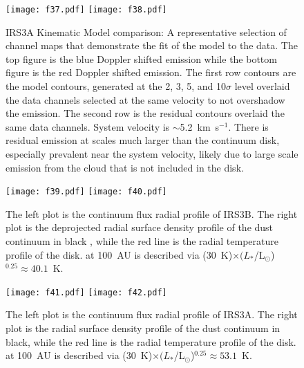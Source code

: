 \documentclass[twocolumn, 12pt]{aastex63}
\newcommand{\ab}{$\sim$}
\newcommand{\lsun}{L$_{\odot}$}
\begin{document}
\begin{figure}[H]
\begin{center}
\texttt{[image: f37.pdf]}
\texttt{[image: f38.pdf]}
\end{center}
\caption{IRS3A Kinematic Model comparison: A representative selection of channel maps that demonstrate the fit of the model to the data. The top figure is the blue Doppler shifted emission while the bottom figure is the red Doppler shifted emission. The first row contours are the model contours, generated at the 2, 3, 5, and 10$\sigma$  level overlaid the data channels selected at the same velocity to not overshadow the emission. The second row is the residual contours overlaid the same data channels. System velocity is \ab5.2~km~s$^{-1}$. There is residual emission at scales much larger than the continuum disk, especially prevalent near the system velocity, likely due to large scale emission from the cloud that is not included in the disk.}\label{fig:h13cn_res}
\end{figure}


\begin{figure}[H]
\begin{center}
\texttt{[image: f39.pdf]}
\texttt{[image: f40.pdf]}
\end{center}
\caption{The left plot is the continuum flux  radial profile of IRS3B. The right plot is the deprojected radial surface density profile of the dust continuum in black , while the red line is the radial temperature profile of the disk.  at 100~AU is described via (30~K)$\times(L_{*}$/\lsun)$^{0.25}\approx40.1$~K.}\label{fig:surfacedensity}
\end{figure}

\begin{figure}[H]
\begin{center}
\texttt{[image: f41.pdf]}
\texttt{[image: f42.pdf]}
\end{center}
\caption{The left plot is the continuum flux  radial profile of IRS3A. The right plot is the radial surface density profile of the dust continuum in black, while the red line is the radial temperature profile of the disk.  at 100~AU is described via (30~K)$\times(L_{*}$/\lsun)$^{0.25}\approx53.1$~K.}\label{fig:irs3asurfacedensity}
\end{figure}
\end{document}

